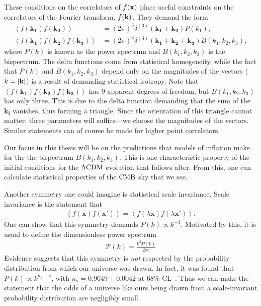     These conditions on the correlators of $f(\mathbf{x})$ place useful constraints on the correlators of the
    Fourier transform, $f(\mathbf{k})$. They demand the form
    \begin{align}\label{spectrum_definitions}
        \left<f(\mathbf{k_1})f(\mathbf{k_2})\right> &= (2\pi)^3\delta^{(3)}(\mathbf{k_1}+\mathbf{k_2})P(k_1),\\
        \left<f(\mathbf{k_1})f(\mathbf{k_2})f(\mathbf{k_3})\right> &= (2\pi)^3\delta^{(3)}(\mathbf{k_1}+\mathbf{k_2}+\mathbf{k_3})B(k_1,k_2,k_3),
    \end{align}
    where $P(k)$ is known as the power spectrum and $B(k_1,k_2,k_3)$ is the bispectrum.
    The delta functions come from statistical homogeneity, while the fact that $P(k)$
    and $B(k_1,k_2,k_3)$ depend only on the magnitudes of the vectors ($k=\left|\mathbf{k}\right|$) is a result
    of demanding statistical isotropy.
    Note that $\left<f(\mathbf{k_1})f(\mathbf{k_2})f(\mathbf{k_3})\right>$
    has $9$ apparent degrees of freedom, but $B(k_1,k_2,k_3)$ has only three.
    This is due to the delta function
    demanding that the sum of the $\mathbf{k_i}$ vanishes, thus forming a triangle.
    Since the orientation of this triangle
    cannot matter, three parameters will suffice---we choose the magnitudes of the vectors.
    Similar statements can of course be made for higher point correlators.


    Our focus in this thesis will be on the predictions that models of inflation make
    for the the bispectrum $B(k_1,k_2,k_3)$.
    This is one characteristic property of 
    the initial conditions for the $\Lambda\text{CDM}$ evolution that follows after. From
    this, one can calculate statistical properties of the $\text{CMB}$ sky that we see.


    Another symmetry one could imagine is statistical scale invariance.
    Scale invariance is the statement that
    \begin{align}
        \left<f(\mathbf{x})f(\mathbf{x'})\right> = \left<f(\lambda\mathbf{x})f(\lambda\mathbf{x'})\right>.
    \end{align}
    One can show that this symmetry demands $P(k)\propto k^{-3}$.
    Motivated by this, it is usual to define the dimensionless power spectrum
    \begin{align}\label{primpowerspec_defn}
        \mathcal{P}(k) = \frac{k^3P(k)}{2\pi^2}
    \end{align}
    Evidence suggests that this symmetry is \textit{not} respected by the probability
    distribution from which our universe was drawn.
    In fact, it was found that $P(k)\propto k^{n_s-4}$, with $n_s=0.9649 \pm 0.0042$
    at $68\%$ CL~\cite{Planck_inflation_2015, Planck_inflation_2018}.
    Thus we can make the statement that
    the odds of a universe like ours being drawn from a scale-invariant probability
    distribution are negligibly small.


